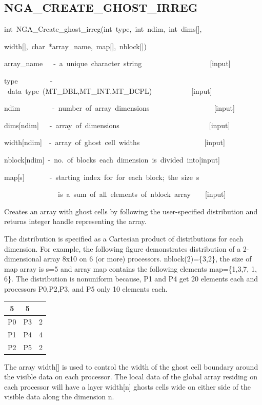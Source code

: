 \subsection*{\label{sub:NGA_CREATE_GHOST_IRREG}NGA\_CREATE\_GHOST\_IRREG}
\begin{lyxcode}
int~NGA\_Create\_ghost\_irreg(int~type,~int~ndim,~int~dims{[}{]},~

width{[}{]},~char~{*}array\_name,~map{[}{]},~nblock{[}{]})



array\_name~~~-~a~unique~character~string~~~~~~~~~~~~~~~~~~~{[}input{]}

type~~~~~~~~~-~data~type~(MT\_DBL,MT\_INT,MT\_DCPL)~~~~~~~~~~~{[}input{]}~

ndim~~~~~~~~~-~number~of~array~dimensions~~~~~~~~~~~~~~~~~~{[}input{]}~

dims{[}ndim{]}~~~-~array~of~dimensions~~~~~~~~~~~~~~~~~~~~~~~~~{[}input{]}~

width{[}ndim{]}~~-~array~of~ghost~cell~widths~~~~~~~~~~~~~~~~~~{[}input{]}~

nblock{[}ndim{]}~-~no.~of~blocks~each~dimension~is~divided~into{[}input{]}~

map{[}s{]}~~~~~~~-~starting~index~for~for~each~block;~the~size~s~

~~~~~~~~~~~~~~~is~a~sum~of~all~elements~of~nblock~array~~~~{[}input{]}
\end{lyxcode}
Creates an array with ghost cells by following the user-specified
distribution and returns integer handle representing the array.

The distribution is specified as a Cartesian product of distributions
for each dimension. For example, the following figure demonstrates
distribution of a 2-dimensional array 8x10 on 6 (or more) processors.
nblock(2)=\{3,2\}, the size of map array is s=5 and array map contains
the following elements map=\{1,3,7, 1, 6\}. The distribution is nonuniform
because, P1 and P4 get 20 elements each and processors P0,P2,P3, and
P5 only 10 elements each. 

\begin{tabular}{|c|c|c|}
\cline{1-2} 
5 & 5 & \multicolumn{1}{c}{}\tabularnewline
\hline 
P0 & P3 & 2\tabularnewline
\hline 
P1 & P4 & 4\tabularnewline
\hline 
P2 & P5 & 2\tabularnewline
\hline
\end{tabular} 

The array width{[}{]} is used to control the width of the ghost cell
boundary around the visible data on each processor. The local data
of the global array residing on each processor will have a layer width{[}n{]}
ghosts cells wide on either side of the visible data along the dimension
n.

